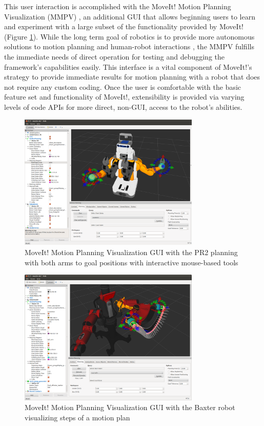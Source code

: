\documentclass[10pt,journal,compsoc]{joser1}
\begin{document}
{This user interaction is accomplished with the MoveIt! Motion Planning Visualization (MMPV) \cite{moveit}, an additional GUI that allows beginning users to learn and experiment with a large subset of the functionality provided by MoveIt! (Figure \ref{fig:motionrvizplugin}). While the long term goal of robotics is to provide more autonomous solutions to motion planning and human-robot interactions \cite{yancotaxonomy}, the MMPV fulfills the immediate needs of direct operation for testing and debugging the framework's capabilities easily. This interface is a vital component of MoveIt!'s strategy to provide immediate results for motion planning with a robot that does not require any custom coding. Once the user is comfortable with the basic feature set and functionality of MoveIt!, extensibility is provided via varying levels of code APIs for more direct, non-GUI, access to the robot's abilities.

\begin{figure}[!t]
\centering
\includegraphics[width=3.4in]{images/rviz_motion_planning}
\caption{MoveIt! Motion Planning Visualization GUI with the PR2 planning with both arms to goal positions with interactive mouse-based tools}
\label{fig:motionrvizplugin}
\end{figure}

\begin{figure}[!t]
\centering
\includegraphics[width=3.4in]{images/motion_plan}
\caption{MoveIt! Motion Planning Visualization GUI with the Baxter robot visualizing steps of a motion plan}
\label{fig:motion_plan}	
\end{figure}

}
\end{document}
